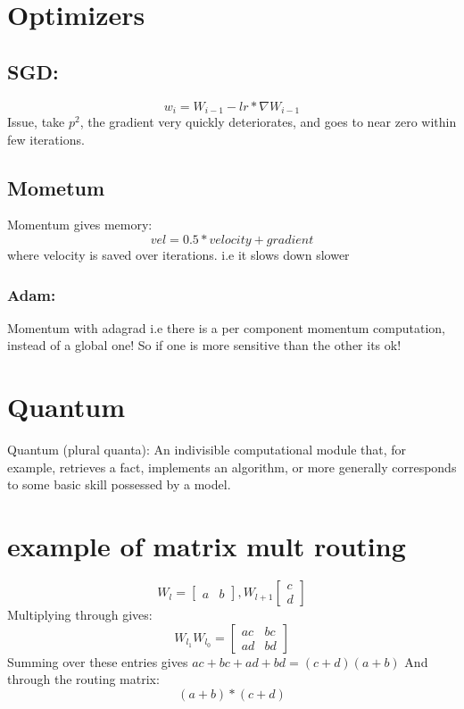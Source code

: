 \documentclass[12pt]{article}
\begin{document}
\section{Optimizers}
\subsection{SGD:}

\[
    w_{i} = W_{i-1} - lr * \nabla W_{i-1} 
\]
Issue, take $p^2$, the gradient very quickly deteriorates, and goes to near zero within few iterations. 

\subsection{Mometum}
Momentum gives memory:
\[
    vel = 0.5 * velocity + gradient
\]
where velocity is saved over iterations. i.e it slows down slower

\subsubsection{Adam:}
Momentum with adagrad i.e there is a per component momentum computation, instead of a global one!
So if one is more sensitive than the other its ok!



\section{Quantum}
Quantum (plural quanta): An indivisible computational module that,
for example, retrieves a fact, implements an algorithm, or more generally
corresponds to some basic skill possessed by a model.


\section{example of matrix mult routing}
\[
    W_{l} = \begin{bmatrix}
    a & b
    \end{bmatrix}, W_{l+1} \begin{bmatrix}
    c\\
    d
    \end{bmatrix}
\]
Multiplying through gives:
\[
    W_{l_{1}} W_{l_{0}} = \begin{bmatrix}
    ac & bc\\
    ad & bd
    \end{bmatrix}
\]
Summing over these entries gives $ac+bc+ad+bd= (c+d)(a+b)$
And through the routing matrix:
\[
    (a+b) * (c+d)
\]
\end{document}
